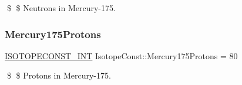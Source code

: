 \$ \$ Neutrons in Mercury-\/175. \mbox{\label{group___isotope_const-_mercury-_hg175_gacf30aab40cf5e2e17aad1558c3d8c1d1}} 
\subsubsection{\texorpdfstring{Mercury175\+Protons}{Mercury175Protons}}
{\footnotesize\ttfamily \mbox{\hyperlink{group___isotope_const-_macros_ga5f18360b3e99483a35c32d789e62621c}{I\+S\+O\+T\+O\+P\+E\+C\+O\+N\+S\+T\+\_\+\+I\+NT}} Isotope\+Const\+::\+Mercury175\+Protons = 80}

\$ \$ Protons in Mercury-\/175. 